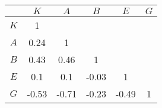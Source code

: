 \begin{tabular}{c  c  c  c  c  c}\hline \hline
     &  $K$      &     $A$   &      $B$   &      $E$  & $G$ \\ \hline
 $K$ &     1     &           &            &           &   \\ 
 $A$ & 0.24 &      1    &            &           &   \\ 
 $B$ & 0.43 & 0.46 &      1     &           &   \\ 
 $E$ & 0.1 & 0.1 & -0.03 &      1    &   \\ 
 $G$ & -0.53 & -0.71 & -0.23 & -0.49 & 1 \\ \hline \hline
\end{tabular}

